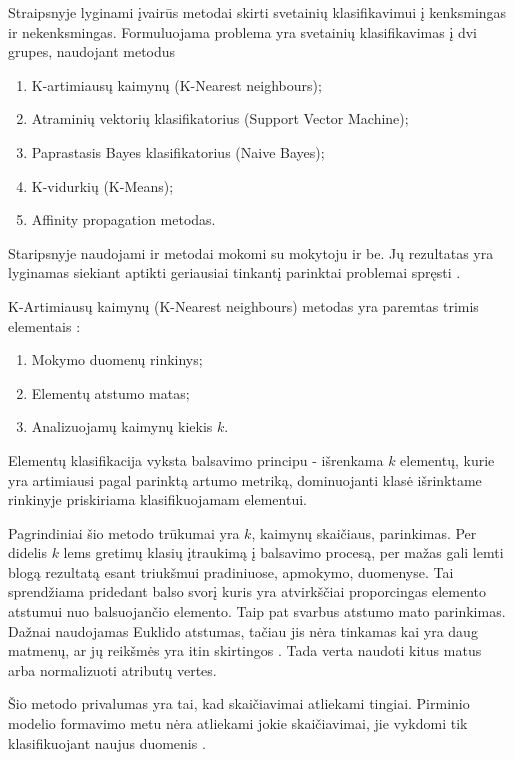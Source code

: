 

Straipsnyje lyginami įvairūs metodai skirti svetainių klasifikavimui į kenksmingas ir nekenksmingas. Formuluojama problema yra svetainių klasifikavimas į dvi grupes, naudojant metodus \cite{comp}
\begin{enumerate}
 \item K-artimiausų kaimynų (K-Nearest neighbours);
 \item Atraminių vektorių klasifikatorius (Support Vector Machine);
 \item Paprastasis Bayes klasifikatorius (Naive Bayes);
 \item K-vidurkių (K-Means);
 \item Affinity propagation metodas.
\end{enumerate}

Staripsnyje naudojami ir metodai mokomi su mokytoju ir be. Jų rezultatas yra lyginamas siekiant aptikti geriausiai tinkantį parinktai problemai spręsti \cite{comp}.

K-Artimiausų kaimynų (K-Nearest neighbours) metodas yra paremtas trimis elementais \cite{Wu2008}:
\begin{enumerate}
    \item Mokymo duomenų rinkinys;
    \item Elementų atstumo matas;
    \item Analizuojamų kaimynų kiekis $k$.
\end{enumerate}
Elementų klasifikacija vyksta balsavimo principu - išrenkama $k$ elementų, kurie yra artimiausi pagal parinktą artumo metriką, dominuojanti klasė išrinktame rinkinyje priskiriama klasifikuojamam elementui.

Pagrindiniai šio metodo trūkumai yra $k$, kaimynų skaičiaus, parinkimas. Per didelis $k$ lems gretimų klasių įtraukimą į balsavimo procesą, per mažas gali lemti blogą rezultatą esant triukšmui pradiniuose, apmokymo, duomenyse. Tai sprendžiama pridedant balso svorį \cite{Wu2008} kuris yra atvirkščiai proporcingas elemento atstumui nuo balsuojančio elemento. Taip pat svarbus atstumo mato parinkimas. Dažnai naudojamas Euklido atstumas, tačiau jis nėra tinkamas kai yra daug matmenų, ar jų reikšmės yra itin skirtingos \cite{Wu2008}. Tada verta naudoti kitus matus arba normalizuoti atributų vertes.

Šio metodo privalumas yra tai,  kad skaičiavimai atliekami tingiai. Pirminio modelio formavimo metu nėra atliekami jokie skaičiavimai, jie vykdomi tik klasifikuojant naujus duomenis \cite{Wu2008}.

